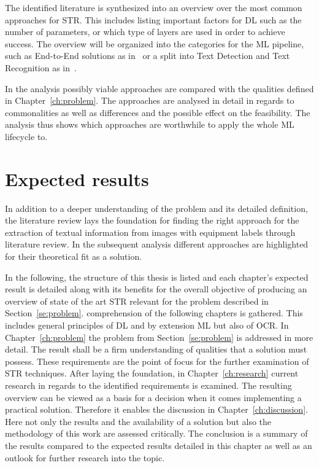 The identified literature is synthesized into an overview over the most common approaches for
\ac{STR}.
This includes listing important factors for \ac{DL} such as the number of parameters, or which
type of layers are used in order to achieve success.
The overview will be organized into the categories for the \ac{ML} pipeline, such as End-to-End
solutions as in~\cite{xing_convolutional_2019} or a split into Text Detection and Text Recognition
as in~\cite{yang_learning_2021, chen_improvement_2018}.

In the analysis possibly viable approaches are compared with the qualities defined
in Chapter~\ref{ch:problem}.
The approaches are analysed in detail in regards to commonalities as well as differences and the
possible effect on the feasibility.
The analysis thus shows which approaches are worthwhile to apply the whole \ac{ML} lifecycle to.

\section{Expected results}
In addition to a deeper understanding of the problem and its detailed definition, the literature
review lays the foundation for finding the right approach for the extraction of textual
information from images with equipment labels through literature review.
In the subsequent analysis different approaches are highlighted for their theoretical fit as a solution.

In the following, the structure of this thesis is listed and each chapter's expected
result is detailed along with its benefits for the overall objective of producing an overview of
state of the art \ac{STR} relevant for the problem described in Section~\ref{se:problem}.
comprehension of the following chapters is gathered.
This includes general principles of \ac{DL} and by extension \ac{ML} but also of \ac{OCR}.\@
In Chapter~\ref{ch:problem} the problem from Section~\ref{se:problem} is addressed in more detail.
The result shall be a firm understanding of qualities that a solution must possess.
These requirements are the point of focus for the further examination of \ac{STR} techniques.
After laying the foundation, in Chapter~\ref{ch:research} current research in regards to the
identified requirements is examined.
The resulting overview can be viewed as a basis for a decision when it comes implementing a practical
solution.
Therefore it enables the discussion in Chapter~\ref{ch:discussion}.
Here not only the results and the availability of a solution but also the methodology of this work
are assessed critically.
The conclusion is a summary of the results compared to the expected results detailed in this chapter
as well as an outlook for further research into the topic.
